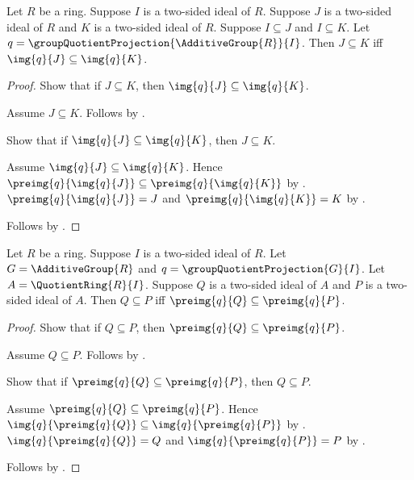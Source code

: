 \begin{theorem}\label{ring_quotient_correspondence_image_inclusion}
    Let $R$ be a ring.
    Suppose $I$ is a two-sided ideal of $R$.
    Suppose $J$ is a two-sided ideal of $R$ and
        $K$ is a two-sided ideal of $R$.
    Suppose $I\subseteq J$ and $I\subseteq K$.
    Let $q=\groupQuotientProjection{\AdditiveGroup{R}}{I}$.
    Then $J\subseteq K$ iff
        $\img{q}{J}\subseteq\img{q}{K}$.
\end{theorem}
\begin{proof}
    Show that if $J\subseteq K$, then
        $\img{q}{J}\subseteq\img{q}{K}$.
    \begin{subproof}
        Assume $J\subseteq K$.
        Follows by .
    \end{subproof}
    Show that if $\img{q}{J}\subseteq\img{q}{K}$, then
        $J\subseteq K$.
    \begin{subproof}
        Assume $\img{q}{J}\subseteq\img{q}{K}$.
        Hence
            $\preimg{q}{\img{q}{J}}
                \subseteq\preimg{q}{\img{q}{K}}$ by
            .
        $\preimg{q}{\img{q}{J}}=J$ and
            $\preimg{q}{\img{q}{K}}=K$ by
            .
    \end{subproof}
    Follows by \auto.
\end{proof}

\begin{theorem}\label{ring_quotient_correspondence_preimage_inclusion}
    Let $R$ be a ring.
    Suppose $I$ is a two-sided ideal of $R$.
    Let $G=\AdditiveGroup{R}$ and
        $q=\groupQuotientProjection{G}{I}$.
    Let $A=\QuotientRing{R}{I}$.
    Suppose $Q$ is a two-sided ideal of $A$ and
        $P$ is a two-sided ideal of $A$.
    Then $Q\subseteq P$ iff
        $\preimg{q}{Q}\subseteq\preimg{q}{P}$.
\end{theorem}
\begin{proof}
    Show that if $Q\subseteq P$, then
        $\preimg{q}{Q}\subseteq\preimg{q}{P}$.
    \begin{subproof}
        Assume $Q\subseteq P$.
        Follows by .
    \end{subproof}
    Show that if $\preimg{q}{Q}\subseteq\preimg{q}{P}$, then
        $Q\subseteq P$.
    \begin{subproof}
        Assume $\preimg{q}{Q}\subseteq\preimg{q}{P}$.
        Hence
            $\img{q}{\preimg{q}{Q}}
                \subseteq\img{q}{\preimg{q}{P}}$ by
            .
        $\img{q}{\preimg{q}{Q}}=Q$ and
            $\img{q}{\preimg{q}{P}}=P$ by
            .
    \end{subproof}
    Follows by \auto.
\end{proof}

